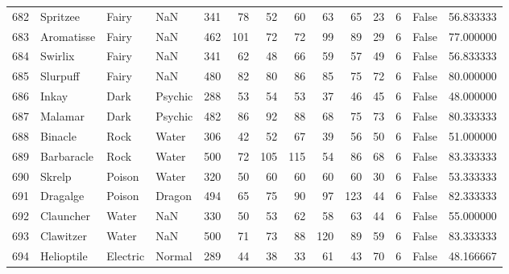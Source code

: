 \begin{tabular}{rlllrrrrrrrrlr}
 682 &                   Spritzee &     Fairy &       NaN &    341 &   78 &      52 &       60 &       63 &       65 &     23 &           6 &      False &   56.833333 \\
 683 &                 Aromatisse &     Fairy &       NaN &    462 &  101 &      72 &       72 &       99 &       89 &     29 &           6 &      False &   77.000000 \\
 684 &                    Swirlix &     Fairy &       NaN &    341 &   62 &      48 &       66 &       59 &       57 &     49 &           6 &      False &   56.833333 \\
 685 &                   Slurpuff &     Fairy &       NaN &    480 &   82 &      80 &       86 &       85 &       75 &     72 &           6 &      False &   80.000000 \\
 686 &                      Inkay &      Dark &   Psychic &    288 &   53 &      54 &       53 &       37 &       46 &     45 &           6 &      False &   48.000000 \\
 687 &                    Malamar &      Dark &   Psychic &    482 &   86 &      92 &       88 &       68 &       75 &     73 &           6 &      False &   80.333333 \\
 688 &                    Binacle &      Rock &     Water &    306 &   42 &      52 &       67 &       39 &       56 &     50 &           6 &      False &   51.000000 \\
 689 &                 Barbaracle &      Rock &     Water &    500 &   72 &     105 &      115 &       54 &       86 &     68 &           6 &      False &   83.333333 \\
 690 &                     Skrelp &    Poison &     Water &    320 &   50 &      60 &       60 &       60 &       60 &     30 &           6 &      False &   53.333333 \\
 691 &                   Dragalge &    Poison &    Dragon &    494 &   65 &      75 &       90 &       97 &      123 &     44 &           6 &      False &   82.333333 \\
 692 &                  Clauncher &     Water &       NaN &    330 &   50 &      53 &       62 &       58 &       63 &     44 &           6 &      False &   55.000000 \\
 693 &                  Clawitzer &     Water &       NaN &    500 &   71 &      73 &       88 &      120 &       89 &     59 &           6 &      False &   83.333333 \\
 694 &                 Helioptile &  Electric &    Normal &    289 &   44 &      38 &       33 &       61 &       43 &     70 &           6 &      False &   48.166667 \\

\end{tabular}
